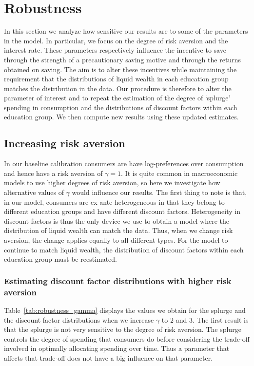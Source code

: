 \documentclass[../HAFiscal]{subfiles}
\begin{document}
\FloatBarrier
\section{Robustness}
\label{sec:robustness}

In this section we analyze how sensitive our results are to some of the parameters in the model. In particular, we focus on the degree of risk aversion and the interest rate. These parameters respectively influence the incentive to save through the strength of a precautionary saving motive and through the returns obtained on saving. The aim is to alter these incentives while maintaining the requirement that the distributions of liquid wealth in each education group matches the distribution in the data. Our procedure is therefore to alter the parameter of interest and to repeat the estimation of the degree of `splurge' spending in consumption and the distributions of discount factors within each education group. We then compute new results using these updated estimates. 

\subsection{Increasing risk aversion} 
\label{sec:robust_gamma} 

In our baseline calibration consumers are have log-preferences over consumption and hence have a risk aversion of $\gamma=1$. It is quite common in macroeconomic models to use higher degrees of risk aversion, so here we investigate how alternative values of $\gamma$ would influence our results. The first thing to note is that, in our model, consumers are ex-ante heterogeneous in that they belong to different education groups and have different discount factors. Heterogeneity in discount factors is thus the only device we use to obtain a model where the distribution of liquid wealth can match the data. Thus, when we change risk aversion, the change applies equally to all different types. For the model to continue to match liquid wealth, the distribution of discount factors within each education group must be reestimated. 

\subsubsection{Estimating discount factor distributions with higher risk aversion}
\label{sec:robust_gamma_estim}

Table~\ref{tab:robustness_gamma} displays the values we obtain for the splurge and the discount factor distributions when we increase $\gamma$ to $2$ and $3$. The first result is that the splurge is not very sensitive to the degree of risk aversion. The splurge controls the degree of spending that consumers do before considering the trade-off involved in optimally allocating spending over time. Thus a parameter that affects that trade-off does not have a big influence on that parameter. 
\end{document}
